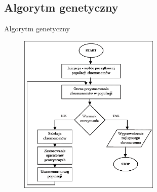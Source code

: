 \documentclass[xcolor=x11names,compress]{beamer}
\renewcommand{\(}{\begin{columns}}
\renewcommand{\)}{\end{columns}}
\newcommand{\<}[1]{\begin{column}{#1}}
\renewcommand{\>}{\end{column}}
\begin{document}
\subsection{Algorytm genetyczny}
\begin{frame}{Algorytm genetyczny}

	\begin{figure} \includegraphics[width=0.6\textwidth]{schemat_ga.png}  \end{figure}

\end{frame}
\end{document}
